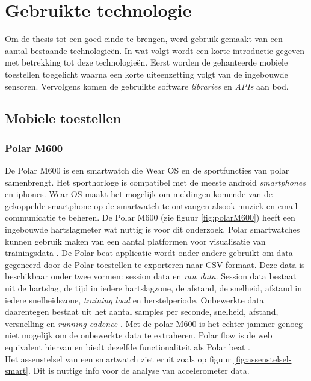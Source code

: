 \chapter{Gebruikte technologie}
Om de thesis tot een goed einde te brengen, werd gebruik gemaakt van een aantal bestaande technologieën. In wat volgt wordt een korte introductie gegeven met betrekking tot deze technologieën. Eerst worden de gehanteerde mobiele toestellen toegelicht waarna een korte uiteenzetting volgt van de ingebouwde sensoren. Vervolgens komen de gebruikte software \textit{libraries} en \textit{APIs} aan bod.

\section{Mobiele toestellen}
\subsection{Polar M600} \label{polar}
De Polar M600 is een smartwatch die Wear OS en de sportfuncties van polar samenbrengt. Het sporthorloge is compatibel met de meeste android \textit{smartphones} en iphones. Wear OS maakt het mogelijk om meldingen komende van de gekoppelde smartphone op de smartwatch te ontvangen alsook muziek en email communicatie te beheren. De Polar M600 (zie figuur \ref{fig:polarM600}) heeft een ingebouwde hartslagmeter wat nuttig is voor dit onderzoek.
Polar smartwatches kunnen gebruik maken van een aantal platformen voor visualisatie van trainingsdata \cite{ref24}. 
De Polar beat applicatie wordt onder andere gebruikt om data gegeneerd door de Polar toestellen te exporteren naar CSV formaat. Deze data is beschikbaar onder twee vormen: session data en \textit{raw data}. Session data bestaat uit de hartslag, de tijd in iedere hartslagzone, de afstand, de snelheid, afstand in iedere snelheidszone, \textit{training load} en herstelperiode. Onbewerkte data daarentegen bestaat uit het aantal samples per seconde, snelheid, afstand, versnelling en \textit{running cadence} \citep{ref8}. 
Met de polar M600 is het echter jammer genoeg niet mogelijk om de onbewerkte data te extraheren.
Polar flow is de web equivalent hiervan en biedt dezelfde functionaliteit als Polar beat \citep{ref9}. \\
Het assenstelsel van een smartwatch ziet eruit zoals op figuur \ref{fig:assenstelsel-smart}. Dit is nuttige info voor de analyse van accelerometer data.

\begin{figure}[!htpd]
\centering
\begin{floatrow}
\end{floatrow}
\end{figure}

